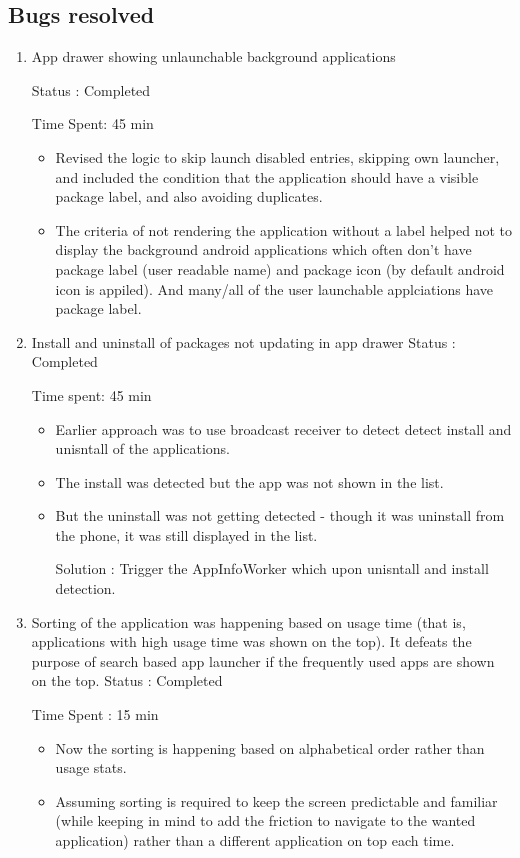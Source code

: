 \documentclass{article}
\begin{document}
\subsection{Bugs resolved}
\begin{enumerate}
    \item App drawer showing unlaunchable background applications
    
    Status : Completed

    Time Spent: 45 min
    \begin{itemize}
        \item Revised the logic to skip launch disabled entries, skipping own launcher, and included the condition that the application should have a visible package label, and also avoiding duplicates.
        \item The criteria of not rendering the application without a label helped not to display the background android applications which often don't have package label (user readable name) and package icon (by default android icon is appiled). And many/all of the user launchable applciations have package label. 
    \end{itemize}
    \item Install and uninstall of packages not updating in app drawer
    Status : Completed

    Time spent: 45 min 
    \begin{itemize}
        \item Earlier approach was to use broadcast receiver to detect detect install and unisntall of the applications.
        \item The install was detected but the app was not shown in the list.
        \item But the uninstall was not getting detected - though it was uninstall from the phone, it was still displayed in the list.
        
        Solution : Trigger the AppInfoWorker which upon unisntall and install detection.
    \end{itemize}
    \item Sorting of the application was happening based on usage time (that is, applications with high usage time was shown on the top). It defeats the purpose of search based app launcher if the frequently used apps are shown on the top.
    Status : Completed
    
    Time Spent : 15 min
    \begin{itemize}
        \item Now the sorting is happening based on alphabetical order rather than usage stats.
        \item Assuming sorting is required to keep the screen predictable and familiar (while keeping in mind to add the friction to navigate to the wanted application) rather than a different application on top each time. 
    \end{itemize}


\end{enumerate}
\end{document}
